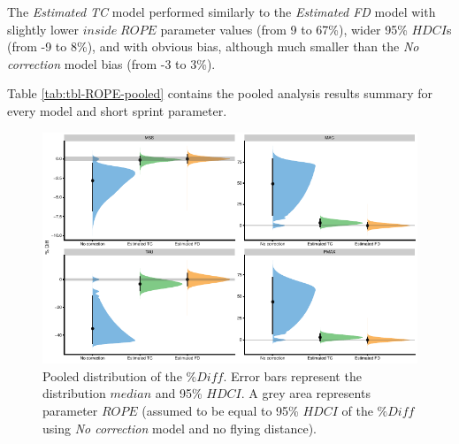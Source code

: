 \documentclass[fleqn,10pt,lineno]{wlpeerj} %
\begin{document}
The \emph{Estimated TC} model performed similarly to the \emph{Estimated FD} model with slightly lower \(inside \; ROPE\) parameter values (from 9 to 67\%), wider 95\% \(HDCI\)s (from -9 to 8\%), and with obvious bias, although much smaller than the \emph{No correction} model bias (from -3 to 3\%).

Table \ref{tab:tbl-ROPE-pooled} contains the pooled analysis results summary for every model and short sprint parameter.



\begin{figure}

{\centering \includegraphics[width=0.9\linewidth]{shorts-simulation-paper_files/figure-latex/graph-ROPE-pooled-1} 

}

\caption{Pooled distribution of the \(\%Diff\). Error bars represent the distribution \(median\) and 95\% \(HDCI\). A grey area represents parameter \(ROPE\) (assumed to be equal to 95\% \(HDCI\) of the \(\%Diff\) using \emph{No correction} model and no flying distance).}\label{fig:graph-ROPE-pooled}
\end{figure}
\end{document}
